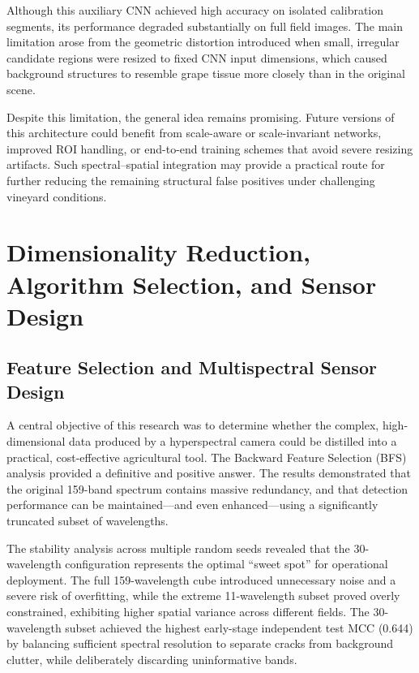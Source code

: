 \noindent
Although this auxiliary CNN achieved high accuracy on isolated calibration segments, its performance degraded substantially on full field images. The main limitation arose from the geometric distortion introduced when small, irregular candidate regions were resized to fixed CNN input dimensions, which caused background structures to resemble grape tissue more closely than in the original scene.

\medskip\noindent
Despite this limitation, the general idea remains promising. Future versions of this architecture could benefit from scale-aware or scale-invariant networks, improved ROI handling, or end-to-end training schemes that avoid severe resizing artifacts. Such spectral--spatial integration may provide a practical route for further reducing the remaining structural false positives under challenging vineyard conditions.

\clearpage
\section{Dimensionality Reduction, Algorithm Selection, and Sensor Design}
\label{sec:dimensionality_and_sensors}

\subsection{Feature Selection and Multispectral Sensor Design}
\noindent
A central objective of this research was to determine whether the complex, high-dimensional data produced by a hyperspectral camera could be distilled into a practical, cost-effective agricultural tool. The Backward Feature Selection (BFS) analysis provided a definitive and positive answer. The results demonstrated that the original 159-band spectrum contains massive redundancy, and that detection performance can be maintained---and even enhanced---using a significantly truncated subset of wavelengths.

\medskip\noindent
The stability analysis across multiple random seeds revealed that the 30-wavelength configuration represents the optimal ``sweet spot'' for operational deployment. The full 159-wavelength cube introduced unnecessary noise and a severe risk of overfitting, while the extreme 11-wavelength subset proved overly constrained, exhibiting higher spatial variance across different fields. The 30-wavelength subset achieved the highest early-stage independent test MCC (0.644) by balancing sufficient spectral resolution to separate cracks from background clutter, while deliberately discarding uninformative bands. 

